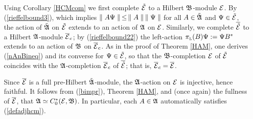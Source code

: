Using Corollary \ref{HCMcom} we first complete $\tilde{{\cal E}}$ to a
Hilbert ${\frak B}$-module ${\cal E}$.  By (\ref{rieffelbound3}), which implies
$\parallel A\Psi\parallel\,\leq\,\parallel A\parallel\,\parallel\Psi\parallel$ for all $A\in\tilde{{\frak A}}$ and
$\Psi\in\tilde{{\cal E}}$, the action of $\tilde{{\frak A}}$ on $\tilde{{\cal E}}$ extends to
an action of ${\frak A}$ on ${\cal E}$.  Similarly, we complete $\overline{\tilde{{\cal E}}}$
to a Hilbert ${\frak A}$-module $\overline{{\cal E}}_c$; by (\ref{rieffelbound22}) the
left-action $\pi_{\mbox{\tiny L}}(B)\Psi:=\Psi B^*$ extends to an action of ${\frak B}$ on
$\overline{{\cal E}}_c$.  As in the proof of Theorem \ref{HAM}, one derives
(\ref{nAnBineq}) and its converse for $\Psi\in\tilde{{\cal E}}$, so that the
${\frak B}$-completion ${\cal E}$ of $\tilde{{\cal E}}$ coincides with the
${\frak A}$-completion $\overline{{\cal E}}_c$ of $\overline{\tilde{{\cal E}}}$; that is,
$\overline{{\cal E}}_c=\overline{{\cal E}}$.

Since $\overline{{\cal E}}$ is a full pre-Hilbert $\tilde{{\frak A}}$-module, the
${\frak A}$-action on ${\cal E}$ is injective, hence faithful. It follows from
(\ref{bimpr}), Theorem \ref{HAM}, and (once again) the fullness of
$\overline{{\cal E}}$, that ${\frak A}\simeq C^*_0({\cal E},{\frak B})$.  In particular, each
$A\in{\frak A}$ automatically satisfies (\ref{defadjhcm}).\enp

